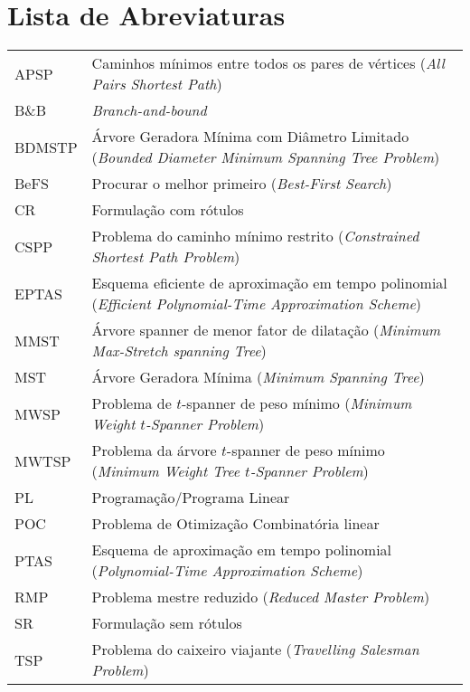 \chapter{Lista de Abreviaturas}
\begin{tabular}{ll}
  APSP    & Caminhos mínimos entre todos os pares de vértices (\emph{All Pairs Shortest Path})\\
  B\&B  & \emph{Branch-and-bound}\\
  BDMSTP        & \makecell[l]{Árvore Geradora Mínima com Diâmetro Limitado \\(\emph{Bounded Diameter Minimum Spanning Tree Problem})}\\
  BeFS  & Procurar o melhor primeiro (\emph{Best-First Search})\\
  CR    & Formulação com rótulos \\
  CSPP  & Problema do caminho mínimo restrito (\emph{Constrained Shortest Path Problem})\\
  EPTAS & \makecell[l]{Esquema eficiente de aproximação em tempo polinomial \\(\emph{Efficient Polynomial-Time Approximation Scheme})}\\
  MMST & Árvore spanner de menor fator de dilatação (\emph{Minimum Max-Stretch spanning Tree})\\
  MST   & Árvore Geradora Mínima (\emph{Minimum Spanning Tree})\\
  MWSP  & Problema de $t$-spanner de peso mínimo (\emph{Minimum Weight $t$-Spanner Problem})\\
  MWTSP & \makecell[l]{Problema da árvore $t$-spanner de peso mínimo \\(\emph{Minimum Weight Tree \hbox{$t$-Spanner} Problem})}\\
  PL    & Programação/Programa Linear\\
  POC   & Problema de Otimização Combinatória linear\\
  PTAS  & \makecell[l]{Esquema de aproximação em tempo polinomial \\(\emph{Polynomial-Time Approximation Scheme})}\\
  RMP   & Problema mestre reduzido (\emph{Reduced Master Problem})\\
  SR    & Formulação sem rótulos\\
  TSP   & Problema do caixeiro viajante (\emph{Travelling Salesman Problem})
\end{tabular}


